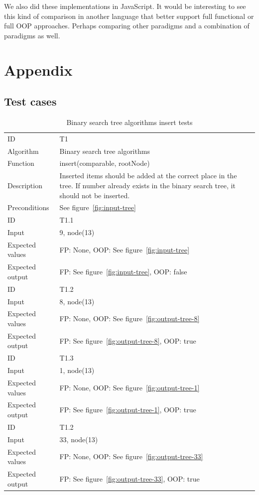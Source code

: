 \documentclass {article}
\begin{document}
We also did these implementations in JavaScript. It would be interesting to see this kind of comparison in another language that better support full functional or full OOP approaches. Perhaps comparing other paradigms and a combination of paradigms as well.



\appendix
\section{Appendix}
\label{appendix:test-cases}
\subsection{Test cases}
\begin{table}[H]
\begin{tabular}{ | l p{10cm} | }
\hline
ID & T1 \\
Algorithm & Binary search tree algorithms \\
Function & insert(comparable, rootNode) \\
Description & Inserted items should be added at the correct place in the tree. If number already exists in the binary search tree, it should not be inserted. \\
Preconditions & See figure~\ref{fig:input-tree} \\
\hline
ID & T1.1 \\
Input & 9, node(13) \\
Expected values & FP: None, OOP: See figure~\ref{fig:input-tree} \\
Expected output & FP: See figure~\ref{fig:input-tree}, OOP: false \\
\hline
ID & T1.2 \\
Input & 8, node(13) \\
Expected values & FP: None, OOP: See figure~\ref{fig:output-tree-8} \\
Expected output & FP: See figure~\ref{fig:output-tree-8}, OOP: true \\
\hline
ID & T1.3 \\
Input & 1, node(13) \\
Expected values & FP: None, OOP: See figure~\ref{fig:output-tree-1} \\
Expected output & FP: See figure~\ref{fig:output-tree-1}, OOP: true \\
\hline
ID & T1.2 \\
Input & 33, node(13) \\
Expected values & FP: None, OOP: See figure~\ref{fig:output-tree-33} \\
Expected output & FP: See figure~\ref{fig:output-tree-33}, OOP: true \\
\hline
\end{tabular}
\caption{Binary search tree algorithms insert tests}
\label{tab:insert-tests}
\end{table}
\end{document}
